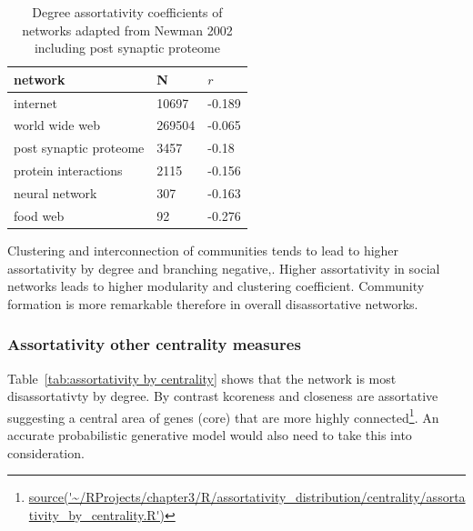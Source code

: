 \begin{table}[]
    \centering
    \begin{tabular}{lll}
    \toprule
       network  &N& $r$  \\
       \midrule
       internet & 10697&-0.189\\
       world wide web &269504 & -0.065\\
       post synaptic proteome & 3457 & -0.18\\
       protein interactions & 2115 & -0.156\\
       neural network & 307 & -0.163\\
       food web & 92 & -0.276 \\
       \bottomrule
    \end{tabular}
    \caption{Degree assortativity coefficients of networks adapted from Newman 2002 \cite{newman2002assortative} including post synaptic proteome}
    \label{Table:DegreeAssortativityNewman}
\end{table}

 

Clustering and interconnection of communities tends to lead to higher assortativity by degree and branching negative\cite{estrada2011combinatorial},\cite{noldus2015assortativity}. Higher assortativity in social networks leads to higher modularity and clustering coefficient\cite{noldus2015assortativity}. Community formation is more remarkable therefore in overall disassortative networks. 

%
%
%
\subsubsection{Assortativity other centrality measures}


Table~\ref{tab:assortativity by centrality} shows that the network is most disassortativty by degree. By contrast kcoreness and closeness are assortative suggesting a central area of genes (core) that are more highly connected\footnote{\url{source('~/RProjects/chapter3/R/assortativity_distribution/centrality/assortativity_by_centrality.R')}}. An accurate probabilistic generative model would also need to take this into consideration.  

